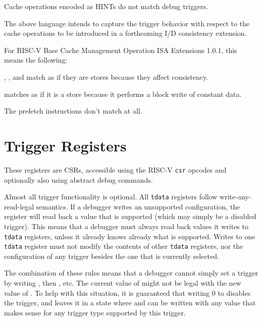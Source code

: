 Cache operations encoded as HINTs do not match debug triggers.

\begin{commentary}
    The above language intends to capture the trigger behavior with respect to
    the cache operations to be introduced in a forthcoming I/D consistency
    extension.

    \begin{steps}{For RISC-V Base Cache Management Operation ISA Extensions
            1.0.1, this means the following:}
        \item {}, , and  match as
            if they are stores because they affect consistency.
        \item {} matches as if it is a store because it performs a
            block write of constant data.
        \item The prefetch instructions don't match at all.
    \end{steps}
\end{commentary}

\section{Trigger Registers}

These registers are CSRs, accessible using the RISC-V {\tt csr} opcodes and
optionally also using abstract debug commands.

Almost all trigger functionality is optional. All {\tt tdata} registers follow
write-any-read-legal semantics. If a debugger writes an unsupported
configuration, the register will read back a value that is supported (which may
simply be a disabled trigger).  This means that a debugger must always read
back values it writes to {\tt tdata} registers, unless it already knows already
what is
supported.  Writes to one {\tt tdata} register must not modify the contents of
other {\tt tdata} registers, nor the configuration of any trigger besides the
one that is currently selected.

The combination of these rules means that a debugger cannot simply set a
trigger by writing \RcsrTdataOne, then \RcsrTdataTwo, etc. The current value
of \RcsrTdataTwo might not be legal with the new value of \RcsrTdataOne. To
help with this situation, it is guaranteed that writing 0 to \RcsrTdataOne
disables the trigger, and leaves it in a state where \RcsrTdataTwo and
\RcsrTdataThree can be written with any value that makes sense for any
trigger type supported by this trigger.

